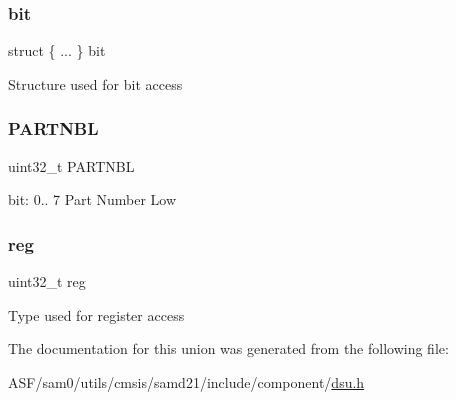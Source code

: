 \subsubsection{\texorpdfstring{bit}{bit}}
{\footnotesize\ttfamily struct \{ ... \}   bit}

Structure used for bit access \mbox{\label{union_d_s_u___p_i_d0___type_a97838df28c1bc21b366053f3b09102f5}} 
\subsubsection{\texorpdfstring{PARTNBL}{PARTNBL}}
{\footnotesize\ttfamily uint32\+\_\+t P\+A\+R\+T\+N\+BL}

bit\+: 0.. 7 Part Number Low \mbox{\label{union_d_s_u___p_i_d0___type_a6b91636401516a477989a336376d7b40}} 
\subsubsection{\texorpdfstring{reg}{reg}}
{\footnotesize\ttfamily uint32\+\_\+t reg}

Type used for register access 

The documentation for this union was generated from the following file\+:\begin{DoxyCompactItemize}
\item 
A\+S\+F/sam0/utils/cmsis/samd21/include/component/\mbox{\hyperlink{component_2dsu_8h}{dsu.\+h}}\end{DoxyCompactItemize}
